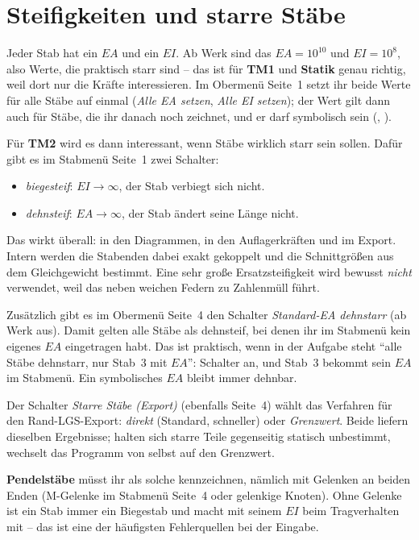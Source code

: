 
\section{Steifigkeiten und starre Stäbe}\label{sec:starr}

Jeder Stab hat ein $EA$ und ein $EI$. Ab Werk sind das $EA = 10^{10}$ und $EI = 10^{8}$, also
Werte, die praktisch starr sind -- das ist für \textbf{TM1} und \textbf{Statik} genau richtig,
weil dort nur die Kräfte interessieren. Im Obermenü Seite~1 setzt ihr beide Werte für alle Stäbe
auf einmal (\emph{Alle EA setzen}, \emph{Alle EI setzen}); der Wert gilt dann auch für Stäbe, die
ihr danach noch zeichnet, und er darf symbolisch sein (, ).

Für \textbf{TM2} wird es dann interessant, wenn Stäbe wirklich starr sein sollen. Dafür gibt es
im Stabmenü Seite~1 zwei Schalter:

\begin{itemize}
  \item \emph{biegesteif}: $EI \to \infty$, der Stab verbiegt sich nicht.
  \item \emph{dehnsteif}: $EA \to \infty$, der Stab ändert seine Länge nicht.
\end{itemize}

Das wirkt überall: in den Diagrammen, in den Auflagerkräften und im Export. Intern werden die
Stabenden dabei exakt gekoppelt und die Schnittgrößen aus dem Gleichgewicht bestimmt. Eine sehr
große Ersatzsteifigkeit wird bewusst \emph{nicht} verwendet, weil das neben weichen Federn zu
Zahlenmüll führt.

Zusätzlich gibt es im Obermenü Seite~4 den Schalter \emph{Standard-EA dehnstarr} (ab Werk aus).
Damit gelten alle Stäbe als dehnsteif, bei denen ihr im Stabmenü kein eigenes $EA$ eingetragen
habt. Das ist praktisch, wenn in der Aufgabe steht \enquote{alle Stäbe dehnstarr, nur Stab~3 mit
$EA$}: Schalter an, und Stab~3 bekommt sein $EA$ im Stabmenü. Ein symbolisches $EA$ bleibt immer
dehnbar.

Der Schalter \emph{Starre Stäbe (Export)} (ebenfalls Seite~4) wählt das Verfahren für den
Rand-LGS-Export: \emph{direkt} (Standard, schneller) oder \emph{Grenzwert}. Beide liefern
dieselben Ergebnisse; halten sich starre Teile gegenseitig statisch unbestimmt, wechselt das
Programm von selbst auf den Grenzwert.

\textbf{Pendelstäbe} müsst ihr als solche kennzeichnen, nämlich mit Gelenken an beiden Enden
(M-Gelenke im Stabmenü Seite~4 oder gelenkige Knoten). Ohne Gelenke ist ein Stab immer ein
Biegestab und macht mit seinem $EI$ beim Tragverhalten mit -- das ist eine der häufigsten
Fehlerquellen bei der Eingabe.


